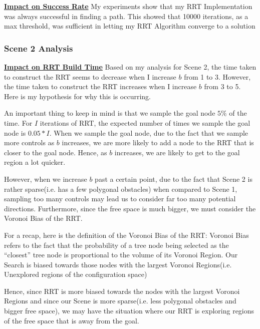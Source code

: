 \documentclass{article}
\begin{document}
\textbf{\underline{Impact on Success Rate}} \newline
My experiments show that my RRT Implementation was always successful in finding a path. This showed that 10000 iterations, as a max threshold, was sufficient in letting my RRT Algorithm converge to a solution

\subsubsection{Scene 2 Analysis}

\textbf{\underline{Impact on RRT Build Time}} \newline
Based on my analysis for Scene 2, the time taken to construct the RRT seems to decrease when I increase $b$ from 1 to 3. However, the time taken to construct the RRT increases when I increase $b$ from 3 to 5. Here is my hypothesis for why this is occurring. \newline 

An important thing to keep in mind is that we sample the goal node $5\%$ of the time. For $I$ iterations of RRT, the expected number of times we sample the goal node is $0.05 * I$. When we sample the goal node, due to the fact that we sample more controls as $b$ increases, we are more likely to add a node to the RRT that is closer to the goal node. Hence, as $b$ increases, we are likely to get to the goal region a lot quicker. \newline 

However, when we increase $b$ past a certain point, due to the fact that Scene 2 is rather sparse(i.e. has a few polygonal obstacles) when compared to Scene 1, sampling too many controls may lead us to consider far too many potential directions. Furthermore, since the free space is much bigger, we must consider the Voronoi Bias of the RRT. \newline 

For a recap, here is the definition of the Voronoi Bias of the RRT: Voronoi Bias refers to the fact that the probability of a tree node being selected as the “closest” tree node is proportional to the volume of its Voronoi Region. Our Search is biased towards those nodes with the largest Voronoi Regions(i.e. Unexplored regions of the configuration space)  \newline 

Hence, since RRT is more biased towards the nodes with the largest Voronoi Regions and since our Scene is more sparse(i.e. less polygonal obstacles and bigger free space), we may have the situation where our RRT is exploring regions of the free space that is away from the goal. \newline 
\end{document}
